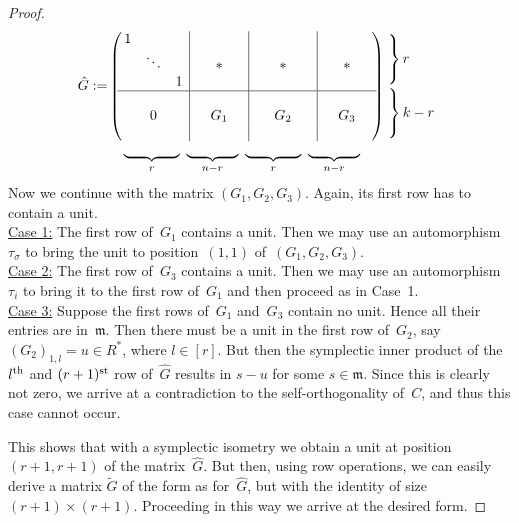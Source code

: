 \documentclass[11pt]{article}
\theoremstyle{definition}
\numberwithin{equation}{section}
\newcommand{\mm}{{\mathfrak m}}
\begin{document}
\begin{proof}
\begin{align*}
    \hat{G}:=&\left(\!\!\begin{array}{ccc|ccc|ccc|ccc}
      1& & & & & & & & & & &\\ &\ddots & &&*&&&*& & &*& \\ & &1& & & & & & & & & \\ \hline & & & & & & & & & & &\\
      &0& & &G_1& & &\ G_2\ & & & G_3 & \\ & & & & & & & & & & &\end{array}\!\!\right)
     \hspace*{-2em}\begin{array}{l}
       \left.\begin{array}{l}\phantom{1} \\ \phantom{\ } \\ \ \end{array}\right\}r \\[3.4ex]
       \left.\begin{array}{l}\phantom{1} \\ \phantom{\ } \\ \ \end{array}\right\}k-r
     \end{array}
      \\[-1ex]
    &\mbox{}\hspace*{1em} \underbrace{\hspace*{4em}}_{r}\ \underbrace{\hspace*{3.7em}}_{n-r}\ \underbrace{\hspace*{4em}}_{r}\
     \underbrace{\hspace*{3.7em}}_{n-r}
\end{align*}
Now we continue with the matrix $(G_1,G_2,G_3)$.
Again, its first row has to contain a unit.
\\
\underline{Case 1:} The first row of~$G_1$ contains a unit.
Then we may use an automorphism~$\tau_{\sigma}$ to bring the unit to position~$(1,1)$ of~$(G_1,G_2,G_3)$.
\\
\underline{Case 2:} The first row of~$G_3$ contains a unit.
Then we may use an automorphism~$\tau_i$ to bring it to the first row of~$G_1$ and then proceed as in Case~1.
\\
\underline{Case 3:} Suppose the first rows of~$G_1$ and~$G_3$ contain no unit.
Hence all their entries are in~$\mm$.
Then there must be a unit in the first
row of~$G_2$, say $(G_2)_{1,l}=u\in R^*$, where $l\in[r]$.
But then the symplectic inner product of the $l^{\rm th}$ and $(r+1)^{\rm st}$ row of~$\hat{G}$ results in $s-u$
for some $s\in\mm$.
Since this is clearly not zero, we arrive at a contradiction to the self-orthogonality of~$C$, and thus this case cannot occur.

This shows that with a symplectic isometry we obtain a unit at position $(r+1,r+1)$ of the matrix~$\hat{G}$.
But then, using row operations, we can easily derive a matrix $\tilde{G}$ of the form as for~$\hat{G}$, but with the identity
of size $(r+1)\times(r+1)$.
Proceeding in this way we arrive at the desired form.
\end{proof}
\end{document}
